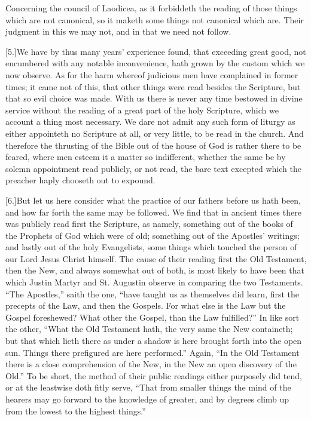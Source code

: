 Concerning the council of Laodicea, as it forbiddeth the reading of those things which are not canonical, so it maketh some things not canonical which are. Their judgment in this we may not, and in that we need not follow.




[5.]We have by thus many years’ experience found, that exceeding great good, not encumbered with any notable inconvenience, hath grown by the custom which we now observe. As for the harm whereof judicious men have complained in former times; it came not of this, that other things were read besides the Scripture, but that so evil choice was made. With us there is never any time bestowed in divine service without the reading of a great part of the holy Scripture, which we account a thing most necessary. We dare not admit any such form of liturgy as either appointeth no Scripture at all, or very little, to be read in the church. And therefore the thrusting of the Bible out of the house of God is rather there to be feared, where men esteem it a matter so indifferent, whether the same be by solemn appointment read publicly, or not read, the bare text excepted which the preacher haply chooseth out to expound.

[6.]But let us here consider what the practice of our fathers before us hath been, and how far forth the same may be followed. We find that in ancient times there was publicly read first the Scripture, as namely, something out of the books of the Prophets of God which were of old; something out of the Apostles’ writings; and lastly out of the holy Evangelists, some things which touched the person  of our Lord Jesus Christ himself.
 The cause of their reading first the Old Testament, then the New, and always somewhat out of both, is most likely to have been that which Justin Martyr and St. Augustin observe in comparing the two Testaments. “The Apostles,” saith the one, “have taught us as themselves did learn, first the precepts of the Law, and then the Gospels. For what else is the Law but the Gospel foreshewed? What other the Gospel, than the Law fulfilled?” In like sort the other, “What the Old Testament hath, the very same the New containeth; but that which lieth there as under a shadow is here brought forth into the open sun. Things there prefigured are here performed.” Again, “In the Old Testament there is a close comprehension of the New, in the New an open discovery of the Old.” To be short,  the method of their public readings either purposely did tend,
 or at the leastwise doth fitly serve, “That from smaller things the mind of the hearers may go forward to the knowledge of greater, and by degrees climb up from the lowest to the highest things.”

